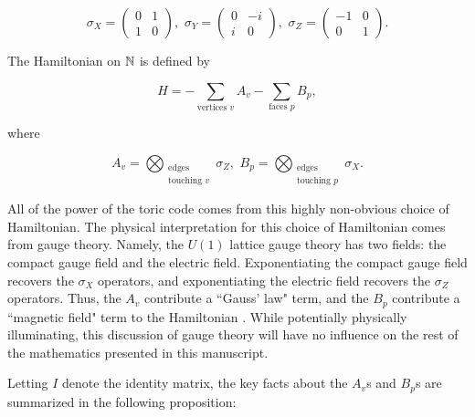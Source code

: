 \documentclass{article}
\theoremstyle{definition}
\numberwithin{figure}{section}
\begin{document}
$$
\sigma_X=
\begin{pmatrix}
0 & 1\\
1 & 0
\end{pmatrix},\,\,
\sigma_Y=
\begin{pmatrix}
0 & -i\\
i & 0
\end{pmatrix},\,\,
\sigma_Z=
\begin{pmatrix}
-1 & 0\\
0 & 1
\end{pmatrix}.
$$

The Hamiltonian on $\mathbb{N}$ is defined by

$$H=-\sum_{\text{vertices } v}A_v-\sum_{\text{faces } p}B_p,$$

where

$$A_v=\bigotimes_{\substack{\text{edges}\\ \text{touching }v}}\sigma_Z,\,\, B_p=\bigotimes_{\substack{\text{edges}\\ \text{touching }p}}\sigma_X.$$

All of the power of the toric code comes from this highly non-obvious choice of Hamiltonian. The physical interpretation for this choice of Hamiltonian comes from gauge theory. Namely, the $U(1)$ lattice gauge theory has two fields: the compact gauge field and the electric field. Exponentiating the compact gauge field recovers the $\sigma_X$ operators, and exponentiating the electric field recovers the $\sigma_Z$ operators. Thus, the $A_v$ contribute a ``Gauss' law" term, and the $B_p$ contribute a ``magnetic field" term to the Hamiltonian \cite{oh2022rank}. While potentially physically illuminating, this discussion of gauge theory will have no influence on the rest of the mathematics presented in this manuscript.

Letting $I$ denote the identity matrix, the key facts about the $A_v$s and $B_p$s are summarized in the following proposition:
\end{document}
